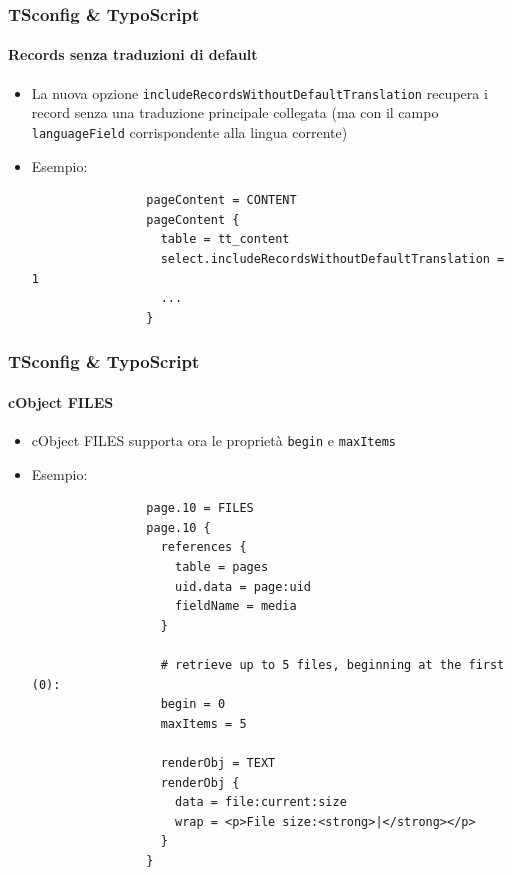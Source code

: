 
\begin{frame}[fragile]
	\frametitle{TSconfig \& TypoScript}
	\framesubtitle{Records senza traduzioni di default}

	\begin{itemize}

		\item La nuova opzione \texttt{includeRecordsWithoutDefaultTranslation}
			recupera i record senza una traduzione principale collegata\newline
			(ma con il campo \texttt{languageField} corrispondente alla lingua corrente)

		\item Esempio:

			\begin{lstlisting}
				pageContent = CONTENT
				pageContent {
				  table = tt_content
				  select.includeRecordsWithoutDefaultTranslation = 1
				  ...
				}
			\end{lstlisting}

	\end{itemize}

\end{frame}


\begin{frame}[fragile]
	\frametitle{TSconfig \& TypoScript}
	\framesubtitle{cObject FILES}

	\begin{itemize}

		\item cObject FILES supporta ora le proprietà \texttt{begin} e \texttt{maxItems} 

		\item Esempio:

			\lstset{
				basicstyle=\tiny\ttfamily
			}

			\begin{lstlisting}
				page.10 = FILES
				page.10 {
				  references {
				    table = pages
				    uid.data = page:uid
				    fieldName = media
				  }

				  # retrieve up to 5 files, beginning at the first (0):
				  begin = 0
				  maxItems = 5

				  renderObj = TEXT
				  renderObj {
				    data = file:current:size
				    wrap = <p>File size:<strong>|</strong></p>
				  }
				}
			\end{lstlisting}

	\end{itemize}

\end{frame}


